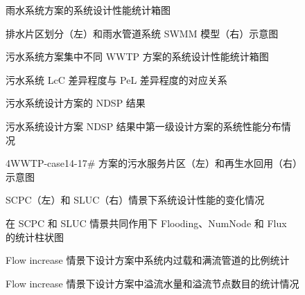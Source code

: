 \documentclass[degree=doctor]{sysuthesis}
\begin{document}
\begin{figure}
  \centering
  \caption{雨水系统方案的系统设计性能统计箱图}
\end{figure}

\clearpage
\setcounter{page}{122}
\begin{figure}
  \centering
  \caption{排水片区划分（左）和雨水管道系统 SWMM 模型（右）示意图}
\end{figure}

\clearpage
\setcounter{page}{125}
\begin{figure}
  \centering
  \caption{污水系统方案集中不同 WWTP 方案的系统设计性能统计箱图}
\end{figure}

\clearpage
\setcounter{page}{126}
\begin{figure}
  \centering
  \caption{污水系统 LcC 差异程度与 PeL 差异程度的对应关系}
\end{figure}

\begin{figure}
  \centering
  \caption{污水系统设计方案的 NDSP 结果}
\end{figure}

\clearpage
\setcounter{page}{127}
\begin{figure}
  \centering
  \caption{污水系统设计方案 NDSP 结果中第一级设计方案的系统性能分布情况}
\end{figure}

\begin{figure}
  \centering
  \caption{4WWTP-case14-17\# 方案的污水服务片区（左）和再生水回用（右）示意图}
\end{figure}

\clearpage
\setcounter{page}{128}
\begin{figure}
  \centering
  \caption{SCPC（左）和 SLUC（右）情景下系统设计性能的变化情况}
\end{figure}

\clearpage
\setcounter{page}{130}
\begin{figure}
  \centering
  \caption{在 SCPC 和 SLUC 情景共同作用下 Flooding、NumNode 和 Flux 的统计柱状图}
\end{figure}

\clearpage
\setcounter{page}{131}
\begin{figure}
  \centering
  \caption{Flow increase 情景下设计方案中系统内过载和满流管道的比例统计}
\end{figure}

\clearpage
\setcounter{page}{132}
\begin{figure}
  \centering
  \caption{Flow increase 情景下设计方案中溢流水量和溢流节点数目的统计情况}
\end{figure}
\end{document}
